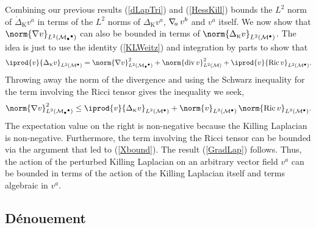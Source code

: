 \documentclass[12pt,letterpaper]{iopart}
\newcommand\Lap[1][K]{\Delta_{\scriptscriptstyle\mathrm{#1}}}
\newcommand\dLap[1][K]{\dot\Delta_{\scriptscriptstyle\mathrm{#1}}}
\newcommand\M{\mathcal{M}}
\newcommand\ind{{\bullet}}
\DeclareMathOperator\Ric{Ric}
\begin{document}
Combining our previous results (\ref{dLapTri}) and (\ref{HessKill}) bounds the $L^2$ norm of $\dLap v^a$ in terms of the $L^2$ norms of $\Lap v^a$, $\nabla\!_a\, v^b$ and $v^a$ itself.  We now show that $\norm{\grad v}_{L^2(\M_\ind{}^\ind)}$ can also be bounded in terms of $\norm{\Lap v}_{L^2(\M^\ind)}$.  The idea is just to use the identity (\ref{KLWeitz}) and integration by parts to show that 
%
\begin{equation}
	\iprod{v}{\Lap v}_{L^2(\M^\ind)} 
		= \norm{\grad v}^2_{L^2(\M_\ind{}^\ind)} 
			+ \norm{\Div v}^2_{L^2(\M)} 
			+ \iprod{v}{\Ric v}_{L^2(\M^\ind)}.
\end{equation}
%
Throwing away the norm of the divergence and using the Schwarz inequality for the term involving the Ricci tensor gives the inequality we seek, 
%
\begin{equation}
	\norm{\grad v}^2_{L^2(\M_\ind{}^\ind)} 
		\le \iprod{v}{\Lap v}_{L^2(\M^\ind)} 
			+ \norm{v}_{L^2(\M^\ind)}\, \norm{\Ric v}_{L^2(\M^\ind)}.
\end{equation}
%
The expectation value on the right is non-negative because the Killing Laplacian is non-negative.  Furthermore, the term involving the Ricci tensor can be bounded via the argument that led to (\ref{Xbound}).  The result (\ref{GradLap}) follows.  Thus, the action of the perturbed Killing Laplacian on an arbitrary vector field $v^a$ can be bounded in terms of the action of the Killing Laplacian itself and terms algebraic in $v^a$.

\subsection{D\'enouement}
\label{dLap<Lap}
\end{document}
